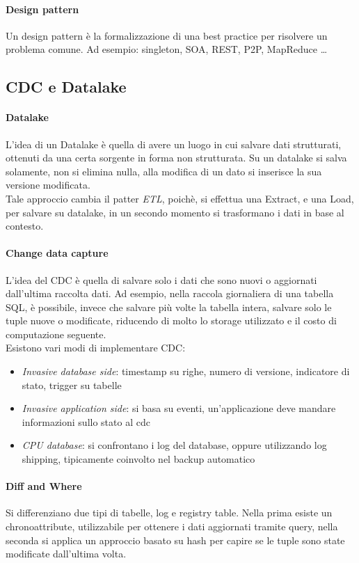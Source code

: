 \documentclass[a4paper]{article}
\begin{document}
\paragraph{Design pattern}
Un design pattern è la formalizzazione di una best practice per risolvere un
problema comune.
Ad esempio: singleton, SOA, REST, P2P, MapReduce \dots

\subsection{CDC e Datalake}

\paragraph{Datalake}
L'idea di un Datalake è quella di avere un luogo in cui salvare dati strutturati, 
ottenuti da una certa sorgente in forma non strutturata. Su un datalake si salva 
solamente, non si elimina nulla, alla modifica di un dato si inserisce la sua versione modificata.\\
Tale approccio cambia il patter \emph{ETL}, poichè, si effettua una Extract, e una 
Load, per salvare su datalake, in un secondo momento si trasformano i dati in base 
al contesto.

\paragraph{Change data capture}
L'idea del CDC è quella di salvare solo i dati che sono nuovi o aggiornati dall'ultima
raccolta dati. Ad esempio, nella raccola giornaliera di una tabella SQL, è possibile, 
invece che salvare più volte la tabella intera, salvare solo le tuple nuove o 
modificate, riducendo di molto lo storage utilizzato e il costo di computazione 
seguente.\\
Esistono vari modi di implementare CDC:
\begin{itemize}
    \item \emph{Invasive database side}: timestamp su righe, numero di versione, 
    indicatore di stato, trigger su tabelle
    \item \emph{Invasive application side}: si basa su eventi, un'applicazione deve mandare informazioni sullo stato al cdc 
    \item \emph{CPU database}: si confrontano i log del database, oppure utilizzando log shipping, tipicamente coinvolto nel backup automatico
\end{itemize}

\paragraph{Diff and Where}
Si differenziano due tipi di tabelle, log e registry table.
Nella prima esiste un chronoattribute, utilizzabile per ottenere i dati aggiornati 
tramite query, nella seconda si applica un approccio basato su hash per capire 
se le tuple sono state modificate dall'ultima volta.
\end{document}
